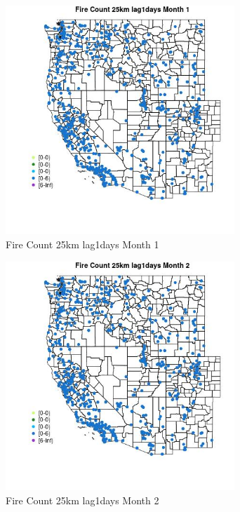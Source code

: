 \begin{figure} 
\centering  
\includegraphics[width=0.77\textwidth]{Code_Outputs/Report_ML_input_PM25_Step4_part_e_de_duplicated_aves_compiled_2019-05-21wNAs_MapObsMo1Fire_Count_25km_lag1days.jpg} 
\caption{\label{fig:Report_ML_input_PM25_Step4_part_e_de_duplicated_aves_compiled_2019-05-21wNAsMapObsMo1Fire_Count_25km_lag1days}Fire Count 25km lag1days Month 1} 
\end{figure} 
 

\begin{figure} 
\centering  
\includegraphics[width=0.77\textwidth]{Code_Outputs/Report_ML_input_PM25_Step4_part_e_de_duplicated_aves_compiled_2019-05-21wNAs_MapObsMo2Fire_Count_25km_lag1days.jpg} 
\caption{\label{fig:Report_ML_input_PM25_Step4_part_e_de_duplicated_aves_compiled_2019-05-21wNAsMapObsMo2Fire_Count_25km_lag1days}Fire Count 25km lag1days Month 2} 
\end{figure} 
 

